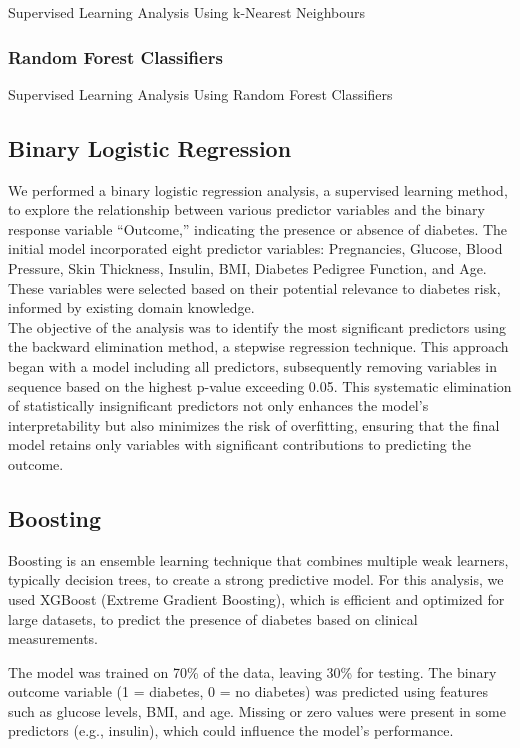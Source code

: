 \documentclass[12pt]{article}
\begin{document}
 Supervised Learning Analysis Using k-Nearest Neighbours

 \subsubsection{Random Forest Classifiers}
 
 Supervised Learning Analysis Using Random Forest Classifiers 

\subsection{Binary Logistic Regression}
We performed a binary logistic regression analysis, a supervised learning method, to explore the relationship between various predictor variables and the binary response variable “Outcome,” indicating the presence or absence of diabetes. The initial model incorporated eight predictor variables: Pregnancies, Glucose, Blood Pressure, Skin Thickness, Insulin, BMI, Diabetes Pedigree Function, and Age. These variables were selected based on their potential relevance to diabetes risk, informed by existing domain knowledge.\\
\setlength{\parindent}{0pt}
The objective of the analysis was to identify the most significant predictors using the backward elimination method, a stepwise regression technique. This approach began with a model including all predictors, subsequently removing variables in sequence based on the highest p-value exceeding 0.05. This systematic elimination of statistically insignificant predictors not only enhances the model’s interpretability but also minimizes the risk of overfitting, ensuring that the final model retains only variables with significant contributions to predicting the outcome.

\subsection{Boosting}

Boosting is an ensemble learning technique that combines multiple weak learners, typically decision trees, to create a strong predictive model. For this analysis, we used XGBoost (Extreme Gradient Boosting), which is efficient and optimized for large datasets, to predict the presence of diabetes based on clinical measurements.

The model was trained on 70\% of the data, leaving 30\% for testing. The binary outcome variable (1 = diabetes, 0 = no diabetes) was predicted using features such as glucose levels, BMI, and age. Missing or zero values were present in some predictors (e.g., insulin), which could influence the model's performance.
\end{document}
